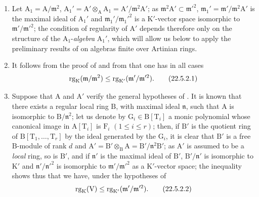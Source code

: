 \begin{remarks}[22.5.2]
\label{0.22.5.2}
\begin{enumerate}
  \item[\rm{(i)}] Let $\mathrm{A}_1=\mathrm{A}/\mathfrak{m}^2$, $\mathrm{A}_1'=\mathrm{A}'\otimes_\mathrm{A}\mathrm{A}_1=\mathrm{A}'/\mathfrak{m}^2\mathrm{A}'$; as $\mathfrak{m}^2\mathrm{A}'\subset\mathfrak{m}'^2$, $\mathfrak{m}_1'=\mathfrak{m}'/\mathfrak{m}^2\mathrm{A}'$ is the maximal ideal of $\mathrm{A}_1'$ and $\mathfrak{m}_1'/\mathfrak{m}_1'^2$ is a $\mathrm{K}'$-vector space isomorphic to $\mathfrak{m}'/\mathfrak{m}'^2$; the condition of regularity of $\mathrm{A}'$ depends therefore only on the structure of the $\mathrm{A}_1$-\emph{algebra} $\mathrm{A}_1'$, which will allow us below to apply the preliminary results of  on algebras finite over Artinian rings.
  \item[\rm{(ii)}] It follows from the proof of  and from  that one has in all cases
\[
\label{0.22.5.2.1}
  \operatorname{rg}_\mathrm{K}(\mathfrak{m}/\mathfrak{m}^2)\leq\operatorname{rg}_{\mathrm{K}'}(\mathfrak{m}'/\mathfrak{m}'^2).
  \tag{22.5.2.1}
\]
  \item[\rm{(iii)}] Suppose that $\mathrm{A}$ and $\mathrm{A}'$ verify the general hypotheses of .
  It is known  that there exists a regular local ring $\mathrm{B}$, with maximal ideal $\mathfrak{n}$, such that $\mathrm{A}$ is isomorphic to $\mathrm{B}/\mathfrak{n}^2$; let us denote by $\mathrm{G}_i\in\mathrm{B}[\mathrm{T}_i]$ a monic polynomial whose canonical image in $\mathrm{A}[\mathrm{T}_i]$ is $\mathrm{F}_i$ $(1\leq i\leq r)$; then, if $\mathrm{B}'$ is the quotient ring of $\mathrm{B}[\mathrm{T}_1,\ldots,\mathrm{T}_r]$ by the ideal generated by the $\mathrm{G}_i$, it is clear that $\mathrm{B}'$ is a free $\mathrm{B}$-module of rank $d$ and $\mathrm{A}'=\mathrm{B}'\otimes_\mathrm{B}\mathrm{A}=\mathrm{B}'/\mathfrak{n}^2\mathrm{B}'$; as $\mathrm{A}'$ is assumed to be a \emph{local} ring, so is $\mathrm{B}'$, and if $\mathfrak{n}'$ is the maximal ideal of $\mathrm{B}'$, $\mathrm{B}'/\mathfrak{n}'$ is isomorphic to $\mathrm{K}'$ and $\mathfrak{n}'/\mathfrak{n}'^2$ is isomorphic to $\mathfrak{m}'/\mathfrak{m}'^2$ as a $\mathrm{K}'$-vector space;
  the inequality  shows thus that we have, under the hypotheses of 
\[
\label{0.22.5.2.2}
  \operatorname{rg}_\mathrm{K}(\mathrm{V})\leq\operatorname{rg}_{\mathrm{K}'}(\mathfrak{m}'/\mathfrak{m}'^2).
  \tag{22.5.2.2}
\]
\end{enumerate}
\end{remarks}

